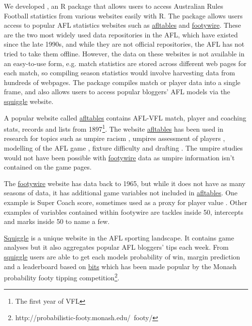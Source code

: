 We developed , an R package  that allows users to access Australian Rules Football statistics from various websites easily with R.
The  package allows users access to popular AFL statistics websites such as \href{https://afltables.com/afl/afl_index.html}{afltables} and \href{https://www.footywire.com}{footywire}. These are the two most widely used data repositories in the AFL, which have existed since the late 1990s, and while they are not official repositories, the AFL has not tried to take them offline. However, the data on these websites is not available in an easy-to-use form, e.g. match statistics are stored across different web pages for each match, so compiling season statistics would involve harvesting data from hundreds of webpages. The  package compiles match or player data into a single frame, and also allows users to access popular bloggers' AFL models via the \href{https://squiggle.com.au}{squiggle} website.


A popular website called \href{https://afltables.com/afl/seas/2018.html}{afltables}  contains AFL-VFL match, player and coaching stats, records and lists from 1897\footnote{The first year of VFL}. The website \href{https://afltables.com/afl/afl_index.html}{afltables} has been used in research for topics such as umpire racism \citep{lenten2017racial}, umpires assessment of players \citep{lenten2019sentiment}, modelling of the AFL game \citep{kiley2016game}, fixture difficulty \citep{lenor2016rivalry} and drafting \citep{lenten2018evaluating}. The umpire studies would not have been possible with \href{https://www.footywire.com}{footywire} data as umpire information isn't contained on the game pages.

The \href{https://www.footywire.com}{footywire} website has data back to 1965, but while it does not have as many seasons of data, it has additional game variables not included in \href{https://afltables.com/afl/afl_index.html}{afltables}. One example is Super Coach score, sometimes used as a proxy for player value \citep{marshall2017effect}. Other examples of variables contained within footywire are tackles inside 50, intercepts and marks inside 50 to name a few.

\href{https://squiggle.com.au}{Squiggle} is a unique website in the AFL sporting landscape. It contains game analyses but it also aggregates popular AFL bloggers' tips each week. From \href{https://squiggle.com.au}{squiggle} users are able to get each models probability of win, margin prediction and a leaderboard based on \href{http://probabilistic-footy.monash.edu/~footy/about.shtml#info}{bits} which has been made popular by the Monash probability footy tipping competition\footnote{http://probabilistic-footy.monash.edu/~footy/}.


